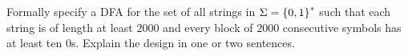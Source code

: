 \begin{problem}
  Formally specify a DFA for the set of all strings in $\Sigma = \left\{0, 1\right\}^*$
  such that each string is of length at least $2000$ and every block of $2000$
  consecutive symbols has at least ten $0$s.
  Explain the design in one or two sentences.
\end{problem}

\begin{Answer}

\end{Answer}
